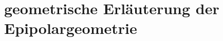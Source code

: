  
% 
% 
% 
% 
% 
% 
% 
% 
% 
% 
% 
% 
%
%


\section{geometrische Erläuterung der Epipolargeometrie}
\label{sec:epipolar} 


